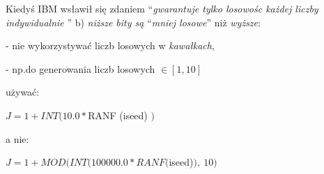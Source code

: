     \begin{frame}
	Kiedyś IBM wsławił się zdaniem ``{\it gwarantuje tylko losowośc każdej liczby indywidualnie }''
    \newline
    \newline
	b) {\it niższe bity są} ``{\it mniej losowe}'' niż {\it wyższe}:
    
    - nie wykorzystywać liczb losowych w {\it kawałkach},

	- np.do generowania liczb losowych $\in[1, 10 ]$

	używać:

	$J=1+INT(10.0*$RANF (iseed) $)$

	a nie:

	$J=1+MOD(INT(100000.0*RANF($iseed)$),\ 10)$
    \end{frame}
    